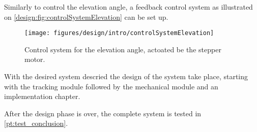 %
%

Similarly to control the elevation angle, a feedback control system as illustrated on \autoref{design:fig:controlSystemElevation} can be set up.
\begin{figure}[!h]
\centering
\texttt{[image: figures/design/intro/controlSystemElevation]}
\caption{Control system for the elevation angle, actoated be the stepper motor.}\label{design:fig:controlSystemElevation}
\end{figure}

%

With the desired system descried the design of the system take place, starting with the tracking module followed by the mechanical module and an implementation chapter. 

After the design phase is over, the complete system is tested in \autoref{pt:test_conclusion}.









